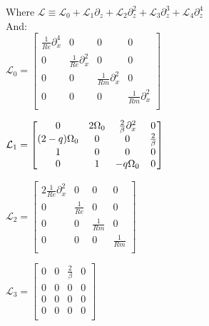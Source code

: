 \documentclass[letterpaper,12pt]{article}
\newcommand\reye{\mathrel{Re}}
\newcommand\reym{\mathrel{Rm}}
\begin{document}
Where $\mathcal{L} \equiv \mathcal{L}_0 + \mathcal{L}_1\partial_z + \mathcal{L}_2\partial_z^2 + \mathcal{L}_3\partial_z^3 + \mathcal{L}_4\partial_z^4$ \\

And: \\

$\mathcal{L}_0 = \left[\begin{matrix}
\frac{1}{\reye}\partial_x^4 & 0 & 0 & 0 \\
0 & \frac{1}{\reye}\partial_x^2 & 0 &0 \\
0 & 0 & \frac{1}{\reym}\partial_x^2 & 0 \\
0 & 0 & 0 & \frac{1}{\reym}\partial_x^2 \\ \end{matrix}\right] $ \\

\vspace{2mm}

$\mathcal{L}_1 = \left[\begin{matrix}
0 & 2 \Omega_0 & \frac{2}{\beta}\partial_x^2 & 0 \\
(2 - q)\Omega_0 & 0 & 0 & \frac{2}{\beta} \\
1 & 0 & 0 & 0 \\
0 & 1 & -q\Omega_0 & 0 \\ \end{matrix}\right] \\$

\vspace{2mm}

$\mathcal{L}_2 = \left[\begin{matrix}
2\frac{1}{\reye} \partial_x^2 & 0 & 0 & 0 \\
0 & \frac{1}{\reye} & 0 & 0 \\
0 & 0 & \frac{1}{\reym} & 0 \\
0 & 0 & 0 & \frac{1}{\reym} \\ \end{matrix}\right]$

\vspace{2mm}

$\mathcal{L}_3 = \left[\begin{matrix}
0 & 0 & \frac{2}{\beta} & 0 \\
0 & 0 & 0 & 0 \\
0 & 0 & 0 & 0 \\
0 & 0 & 0 & 0 \\ \end{matrix} \right] $

\vspace{2mm}
\end{document}

